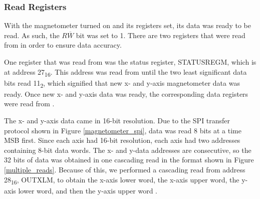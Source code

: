 \subsubsection{Read Registers}
With the magnetometer turned on and its registers set, its data was ready to be read. As such, the $R\overline{W}$ bit was set to 1. There are two registers that were read from in order to ensure data accuracy. 
\par
One register that was read from was the status register, STATUS\textunderscore{}REG\textunderscore{}M, which is at address 27\textsubscript{16}. This address was read from until the two least significant data bits read 11\textsubscript{2}, which signified that new x- and y-axis magnetometer data was ready. Once new x- and y-axis data was ready, the corresponding data registers were read from \cite{lsm9ds1}.
\par
The x- and y-axis data came in 16-bit resolution. Due to the SPI transfer protocol shown in Figure \ref{magnetometer_spi}, data was read 8 bits at a time MSB first. Since each axis had 16-bit resolution, each axis had two addresses containing 8-bit data words. The x- and y-data addresses are consecutive, so the 32 bits of data was obtained in one cascading read in the format shown in Figure \ref{multiple_reads}. Because of this, we performed a cascading read from address 28\textsubscript{16}, OUT\textunderscore{}X\textunderscore{}L\textunderscore{}M, to obtain the x-axis lower word, the x-axis upper word, the y-axis lower word, and then the y-axis upper word \cite{lsm9ds1}.







